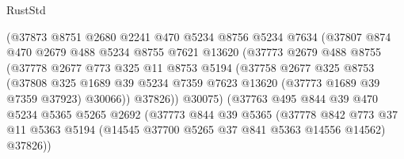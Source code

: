\begin{lexlean}{RustStd}
\begin{coremodule}
                          (@37873
                            @8751
                            @2680
                            @2241
                            @470
                            @5234
                            @8756
                            @5234
                            @7634
                            (@37807
                              @874
                              @470
                              @2679
                              @488
                              @5234
                              @8755
                              @7621
                              @13620
                              (@37773
                                @2679
                                @488
                                @8755
                                (@37778
                                  @2677
                                  @773
                                  @325
                                  @11
                                  @8753
                                  @5194
                                  (@37758
                                    @2677
                                    @325
                                    @8753
                                    (@37808
                                      @325
                                      @1689
                                      @39
                                      @5234
                                      @7359
                                      @7623
                                      @13620
                                      (@37773 @1689 @39 @7359 @37923)
                                      @30066))
                                  @37826))
                              @30075)
                            (@37763
                              @495
                              @844
                              @39
                              @470
                              @5234
                              @5365
                              @5265
                              @2692
                              (@37773
                                @844
                                @39
                                @5365
                                (@37778
                                  @842
                                  @773
                                  @37
                                  @11
                                  @5363
                                  @5194
                                  (@14545 @37700 @5265 @37 @841 @5363 @14556 @14562)
                                  @37826))

\end{coremodule}
\end{lexlean}
